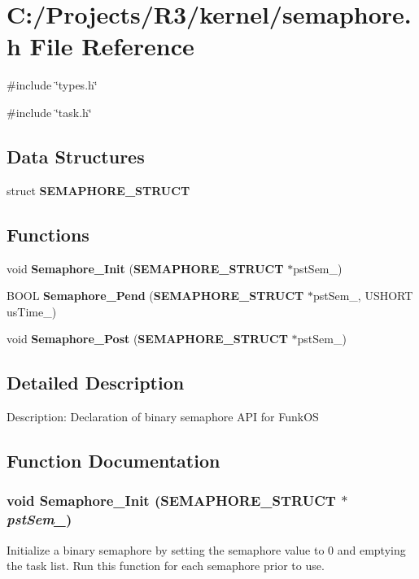 \section{C:/Projects/R3/kernel/semaphore.h File Reference}
\label{semaphore_8h}
{\ttfamily \#include \char`\"{}types.h\char`\"{}}\par
{\ttfamily \#include \char`\"{}task.h\char`\"{}}\par
\subsection*{Data Structures}
\begin{DoxyCompactItemize}
\item 
struct {\bf SEMAPHORE\_\-STRUCT}
\end{DoxyCompactItemize}
\subsection*{Functions}
\begin{DoxyCompactItemize}
\item 
void {\bf Semaphore\_\-Init} ({\bf SEMAPHORE\_\-STRUCT} $\ast$pstSem\_\-)
\item 
BOOL {\bf Semaphore\_\-Pend} ({\bf SEMAPHORE\_\-STRUCT} $\ast$pstSem\_\-, USHORT usTime\_\-)
\item 
void {\bf Semaphore\_\-Post} ({\bf SEMAPHORE\_\-STRUCT} $\ast$pstSem\_\-)
\end{DoxyCompactItemize}


\subsection{Detailed Description}
Description: Declaration of binary semaphore API for FunkOS 

\subsection{Function Documentation}
\subsubsection[{Semaphore\_\-Init}]{\setlength{\rightskip}{0pt plus 5cm}void Semaphore\_\-Init ({\bf SEMAPHORE\_\-STRUCT} $\ast$ {\em pstSem\_\-})}\label{semaphore_8h_a88d82ef215691d5d1811b176aca95b7b}
Initialize a binary semaphore by setting the semaphore value to 0 and emptying the task list. Run this function for each semaphore prior to use.


